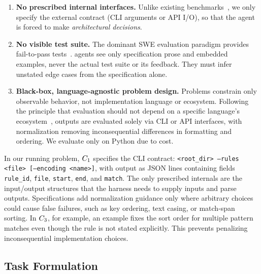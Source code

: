 \begin{enumerate}[leftmargin=*]
    \item \textbf{No prescribed internal interfaces.} Unlike existing benchmarks~\citep{swe-ci,evoclaw}, we only specify the external contract (CLI arguments or API I/O), so that the agent is forced to make \emph{architectural decisions}.
    \item \textbf{No visible test suite.} The dominant SWE evaluation paradigm provides fail-to-pass tests~\citep{swe-bench,swe-bench-plus}. \scb{} agents see only specification prose and embedded examples, never the actual test suite or its feedback. They must infer unstated edge cases from the specification alone.
    \item \textbf{Black-box, language-agnostic problem design.} Problems constrain only observable behavior, not implementation language or ecosystem. Following the principle that evaluation should not depend on a specific language's ecosystem~\citep{multi-swe-bench, swe-polybench, swe-rebench-v2}, outputs are evaluated solely via CLI or API interfaces, with normalization removing inconsequential differences in formatting and ordering. We evaluate only on Python due to cost.
\end{enumerate}

In our running \hyperref[sec:running-example]{\codesearch{}} problem, $C_{1}$ specifies the CLI contract: \texttt{<root\_dir> --rules <file> [--encoding <name>]}, with output as JSON lines containing fields \texttt{rule\_id}, \texttt{file}, \texttt{start}, \texttt{end}, and \texttt{match}. The only prescribed internals are the input/output structures that the harness needs to supply inputs and parse outputs. Specifications add normalization guidance only where arbitrary choices could cause false failures, such as key ordering, text casing, or match-span sorting. In $C_{3}$, for example, an example fixes the sort order for multiple pattern matches even though the rule is not stated explicitly. This prevents penalizing inconsequential implementation choices.

\subsection{Task Formulation}\label{sec:eval-setup}

